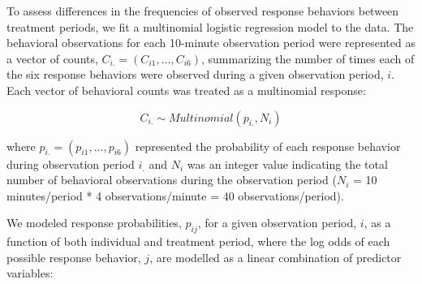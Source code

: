 \documentclass[]{article}
\begin{document}
To assess differences in the frequencies of observed response behaviors
between treatment periods, we fit a multinomial logistic regression
model to the data. The behavioral observations for each 10-minute
observation period were represented as a vector of counts,
\(C_{i.} = (C_{i1},\dots,C_{i6})\), summarizing the number of times each
of the six response behaviors were observed during a given observation
period, \(i\). Each vector of behavioral counts was treated as a
multinomial response:

\[ C_{i.}\sim Multinomial(p_{i.},N_i)\]

where \(p_{i.}=(p_{i1},\dots,p_{i6})\) represented the probability of
each response behavior during observation period \(i_.\) and \(N_i\) was
an integer value indicating the total number of behavioral observations
during the observation period (\(N_i\) = 10 minutes/period * 4
observations/minute = 40 observations/period).

We modeled response probabilities, \(p_{ij}\), for a given observation
period, \(i\), as a function of both individual and treatment period,
where the log odds of each possible response behavior, \(j\), are
modelled as a linear combination of predictor variables:
\end{document}

